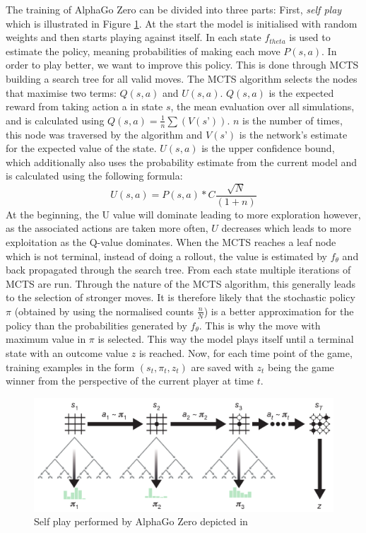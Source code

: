 \documentclass[12pt,a4paper]{article}
\begin{document}
The training of AlphaGo Zero can be divided into three parts: First, \emph{self play} which is illustrated in Figure \ref{fig:selfplay}. At the start the model is initialised with random weights and then starts playing against itself. In each state $f_{theta}$ is used to estimate the policy, meaning probabilities of making each move $P(s,a)$. In order to play better, we want to improve this policy. This is done through MCTS building a search tree for all valid moves. The MCTS algorithm selects the nodes that maximise two terms: $Q(s,a)$ and $U(s,a)$. $Q(s,a)$ is the expected reward from taking action a in state $s$, the mean evaluation over all simulations, and is calculated using $Q(s,a) = \frac{1}{n}\sum(V(s’))$. $n$ is the number of times, this node was traversed by the algorithm and $V(s’)$ is the network's estimate for the expected value of the state. $U(s,a)$ is the upper confidence bound, which additionally also uses the probability estimate from the current model and is calculated using the following formula:
$$U(s,a) = P(s,a) *C\frac{\sqrt{N}}{(1+n)}$$
At the beginning, the U value will dominate leading to more exploration however, as the associated actions are taken more often, $U$ decreases which leads to more exploitation as the Q-value dominates. When the MCTS reaches a leaf node which is not terminal, instead of doing a rollout, the value is estimated by $f_\theta$ and back propagated through the search tree. From each state multiple iterations of MCTS are run. Through the nature of the MCTS algorithm, this generally leads to the selection of stronger moves. It is therefore likely that the stochastic policy $\pi$ (obtained by using the normalised counts $\frac{n}{N}$) is a better approximation for the policy than the probabilities generated by $f_\theta$. This is why the move with maximum value in $\pi$ is selected. This way the model plays itself until a terminal state with an outcome value $z$ is reached. Now, for each time point of the game, training examples in the form $(s_t,\pi_t,z_t)$ are saved with $z_t$ being the game winner from the perspective of the current player at time $t$.

\begin{figure}
  \includegraphics[width=\linewidth]{img/selfplay.png}
  \centering 
  \caption{Self play performed by AlphaGo Zero depicted in \citet{silver_mastering_2017}}
  \label{fig:selfplay}
\end{figure}
\end{document}
